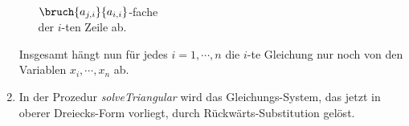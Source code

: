 \begin{enumerate}
\begin{enumerate}
            \\[0.2cm]
            \hspace*{1.3cm}
            $\bruch{a_{j,i}}{a_{i,i}}$-fache 
            \\[0.2cm]
            der $i$-ten Zeile ab.
      \end{enumerate}
      Insgesamt hängt nun für jedes $i=1,\cdots,n$ die $i$-te Gleichung nur noch von den Variablen
      $x_{i}, \cdots, x_{n}$ ab.
\item In der Prozedur \textsl{solveTriangular} wird das Gleichungs-System, das jetzt in oberer Dreiecks-Form 
      vorliegt, durch Rückwärts-Substitution gelöst.
\end{enumerate}


